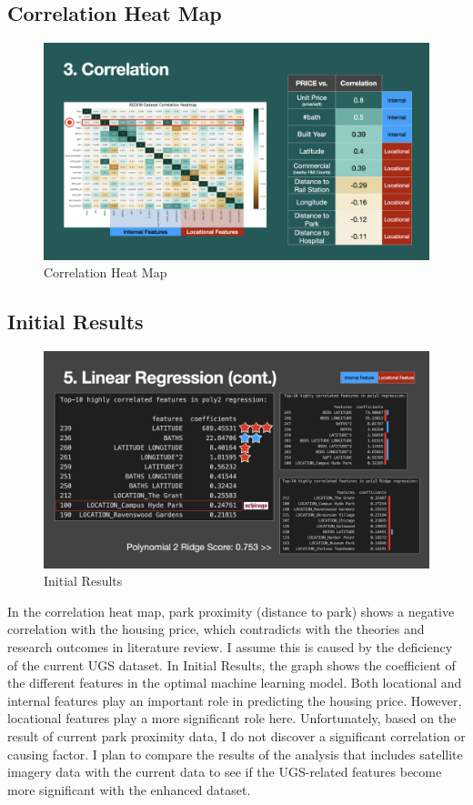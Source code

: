 \documentclass{article}
\begin{document}
\subsection*{Correlation Heat Map}
\begin{figure}[h]
  \centering
  \includegraphics[width=\textwidth]{Visual/heatmap.jpeg}
  \caption{Correlation Heat Map}
\end{figure}

\subsection*{Initial Results}
\begin{figure}[h]
  \centering
  \includegraphics[width=\textwidth]{Visual/results.jpeg}
  \caption{Initial Results}
\end{figure}

In the correlation heat map, park proximity (distance to park) shows a negative correlation with the housing price, which contradicts with the theories and research outcomes in literature review. I assume this is caused by the deficiency of the current UGS dataset. In Initial Results, the graph shows the coefficient of the different features in the optimal machine learning model. Both locational and internal features play an important role in predicting the housing price. However, locational features play a more significant role here. Unfortunately, based on the result of current park proximity data, I do not discover a significant correlation or causing factor. I plan to compare the results of the analysis that includes satellite imagery data with the current data to see if the UGS-related features become more significant with the enhanced dataset.
\end{document}
